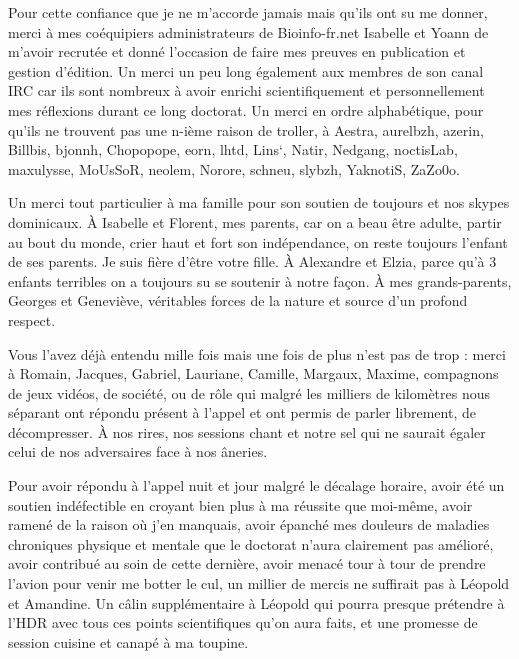 Pour cette confiance que je ne m'accorde jamais mais qu'ils ont su me donner, merci à mes coéquipiers administrateurs de Bioinfo-fr.net Isabelle et Yoann de m'avoir recrutée et donné l'occasion de faire mes preuves en publication et gestion d'édition. Un merci un peu long également aux membres de son canal IRC car ils sont nombreux à avoir enrichi scientifiquement et personnellement mes réflexions durant ce long doctorat. Un merci en ordre alphabétique, pour qu'ils ne trouvent pas une n-ième raison de troller, à Aestra, aurelbzh, azerin, Billbis, bjonnh, Chopopope, eorn, lhtd, Lins`, Natir, Nedgang, noctisLab, maxulysse, MoUsSoR, neolem, Norore, schneu, slybzh, YaknotiS, ZaZo0o.

Un merci tout particulier à ma famille pour son soutien de toujours et nos skypes dominicaux. À Isabelle et Florent, mes parents, car on a beau être adulte, partir au bout du monde, crier haut et fort son indépendance, on reste toujours l'enfant de ses parents. Je suis fière d'être votre fille. À Alexandre et Elzia, parce qu'à 3 enfants terribles on a toujours su se soutenir à notre façon. À mes grands-parents, Georges et Geneviève, véritables forces de la nature et source d'un profond respect.

Vous l'avez déjà entendu mille fois mais une fois de plus n'est pas de trop : merci à Romain, Jacques, Gabriel, Lauriane, Camille, Margaux, Maxime, compagnons de jeux vidéos, de société, ou de rôle qui malgré les milliers de kilomètres nous séparant ont répondu présent à l'appel et ont permis de parler librement, de décompresser. À nos rires, nos sessions chant et notre sel qui ne saurait égaler celui de nos adversaires face à nos âneries.

Pour avoir répondu à l'appel nuit et jour malgré le décalage horaire, avoir été un soutien indéfectible en croyant bien plus à ma réussite que moi-même, avoir ramené de la raison où j'en manquais, avoir épanché mes douleurs de maladies chroniques physique et mentale que le doctorat n'aura clairement pas amélioré, avoir contribué au soin de cette dernière, avoir menacé tour à tour de prendre l'avion pour venir me botter le cul, un millier de mercis ne suffirait pas à Léopold et Amandine. Un câlin supplémentaire à Léopold qui pourra presque prétendre à l'HDR avec tous ces points scientifiques qu'on aura faits, et une promesse de session cuisine et canapé à ma toupine.


